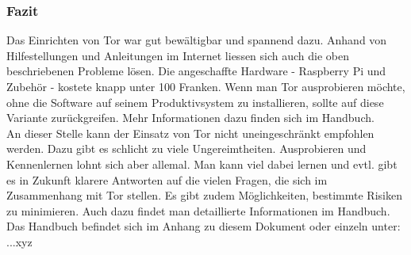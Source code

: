\subsubsection{Fazit}
Das Einrichten von Tor war gut bewältigbar und spannend dazu. Anhand von Hilfestellungen und Anleitungen im Internet liessen sich auch die oben beschriebenen Probleme lösen. Die angeschaffte Hardware - Raspberry Pi und Zubehör - kostete knapp unter 100 Franken. Wenn man Tor ausprobieren möchte, ohne die Software auf seinem Produktivsystem zu installieren, sollte auf diese Variante zurückgreifen. Mehr Informationen dazu finden sich im Handbuch.
\\
An dieser Stelle kann der Einsatz von Tor nicht uneingeschränkt empfohlen werden. Dazu gibt es schlicht zu viele Ungereimtheiten. Ausprobieren und Kennenlernen lohnt sich aber allemal. Man kann viel dabei lernen und evtl. gibt es in Zukunft klarere Antworten auf die vielen Fragen, die sich im Zusammenhang mit Tor stellen. Es gibt zudem Möglichkeiten, bestimmte Risiken zu minimieren. Auch dazu findet man detaillierte Informationen im Handbuch.
\\
Das Handbuch befindet sich im Anhang zu diesem Dokument oder einzeln unter: ...xyz


